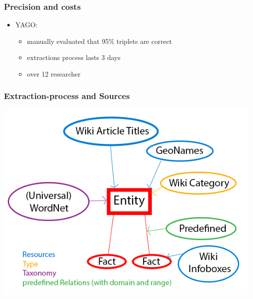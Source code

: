 \begin{frame}
\frametitle{Precision and costs}
\begin{itemize}
\item YAGO:
\begin{itemize}
\item manually evaluated that 95\% triplets are correct
\item extractions process lasts 3 days
\item over 12 researcher
\end{itemize}
\end{itemize}
\end{frame}

\begin{frame}
\frametitle{Extraction-process and Sources}
\includegraphics[scale=0.35]{img/yago-ex1.png}
\end{frame}

